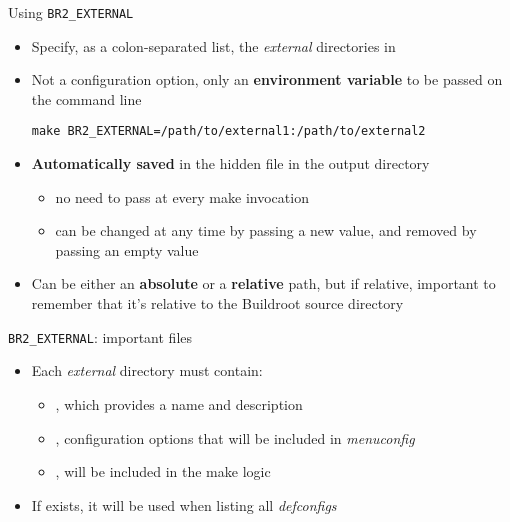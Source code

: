\begin{frame}[fragile]{Using {\tt BR2\_EXTERNAL}}
  \begin{itemize}
  \item Specify, as a colon-separated list, the {\em external}
    directories in 
  \item Not a configuration option, only an {\bf environment variable}
    to be passed on the command line
    \begin{block}{}
\begin{verbatim}
make BR2_EXTERNAL=/path/to/external1:/path/to/external2
\end{verbatim}
    \end{block}
  \item {\bf Automatically saved} in the hidden 
    file in the output directory
    \begin{itemize}
    \item no need to pass  at every make invocation
    \item can be changed at any time by passing a new value, and
      removed by passing an empty value
    \end{itemize}
  \item Can be either an {\bf absolute} or a {\bf relative} path, but
    if relative, important to remember that it's relative to the
    Buildroot source directory
  \end{itemize}
\end{frame}

\begin{frame}{{\tt BR2\_EXTERNAL}: important files}
  \begin{itemize}
  \item Each {\em external} directory must contain:
    \begin{itemize}
    \item {}, which provides a name and description
    \item {}, configuration options that will be
      included in {\em menuconfig}
    \item {}, will be included in the make logic
    \end{itemize}
  \item If  exists, it will be used when listing all
    {\em defconfigs}
  \end{itemize}
\end{frame}

